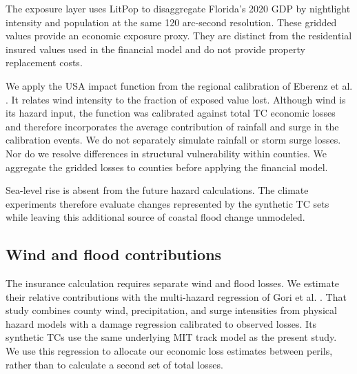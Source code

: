 The exposure layer uses LitPop \cite{eberenz_asset_2020} to disaggregate Florida's 2020 GDP by nightlight intensity and population at the same 120 arc-second resolution. These gridded values provide an economic exposure proxy. They are distinct from the residential insured values used in the financial model and do not provide property replacement costs.

We apply the USA impact function from the regional calibration of Eberenz et al. \cite{eberenz_regional_2021}. It relates wind intensity to the fraction of exposed value lost. Although wind is its hazard input, the function was calibrated against total TC economic losses and therefore incorporates the average contribution of rainfall and surge in the calibration events. We do not separately simulate rainfall or storm surge losses. Nor do we resolve differences in structural vulnerability within counties. We aggregate the gridded losses to counties before applying the financial model.

Sea-level rise is absent from the future hazard calculations. The climate experiments therefore evaluate changes represented by the synthetic TC sets while leaving this additional source of coastal flood change unmodeled.

\subsection*{Wind and flood contributions}\label{MethodsWindFloodSplit}
The insurance calculation requires separate wind and flood losses. We estimate their relative contributions with the multi-hazard regression of Gori et al. \cite{gori_sensitivity_2025,gori_tropical_2025}. That study combines county wind, precipitation, and surge intensities from physical hazard models with a damage regression calibrated to observed losses. Its synthetic TCs use the same underlying MIT track model as the present study. We use this regression to allocate our economic loss estimates between perils, rather than to calculate a second set of total losses.

